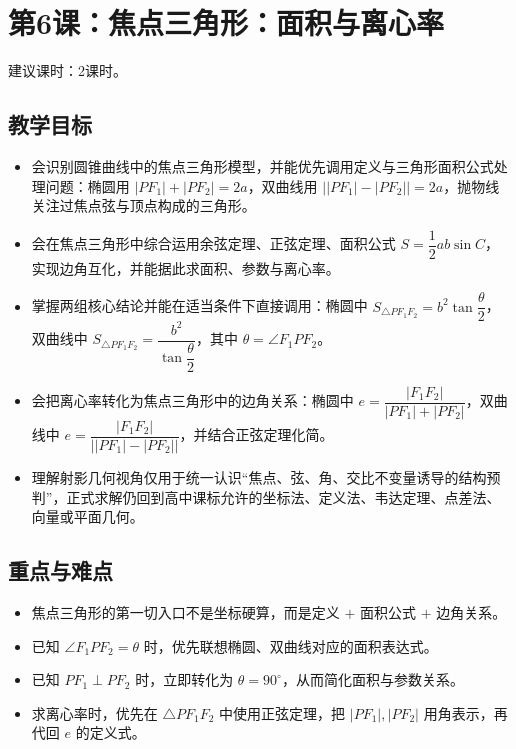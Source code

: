 \documentclass[UTF8,a4paper,11pt]{ctexart}
\begin{document}
\clearpage

\section{第6课：焦点三角形：面积与离心率}

\noindent 建议课时：2课时。

\subsection*{教学目标}

\begin{itemize}

\item 会识别圆锥曲线中的焦点三角形模型，并能优先调用定义与三角形面积公式处理问题：椭圆用 $|PF_1|+|PF_2|=2a$，双曲线用 $\bigl||PF_1|-|PF_2|\bigr|=2a$，抛物线关注过焦点弦与顶点构成的三角形。

\item 会在焦点三角形中综合运用余弦定理、正弦定理、面积公式 $S=\dfrac12 ab\sin C$，实现边角互化，并能据此求面积、参数与离心率。

\item 掌握两组核心结论并能在适当条件下直接调用：椭圆中 $S_{\triangle PF_1F_2}=b^2\tan\dfrac\theta2$，双曲线中 $S_{\triangle PF_1F_2}=\dfrac{b^2}{\tan\dfrac\theta2}$，其中 $\theta=\angle F_1PF_2$。

\item 会把离心率转化为焦点三角形中的边角关系：椭圆中 $e=\dfrac{|F_1F_2|}{|PF_1|+|PF_2|}$，双曲线中 $e=\dfrac{|F_1F_2|}{\bigl||PF_1|-|PF_2|\bigr|}$，并结合正弦定理化简。

\item 理解射影几何视角仅用于统一认识“焦点、弦、角、交比不变量诱导的结构预判”，正式求解仍回到高中课标允许的坐标法、定义法、韦达定理、点差法、向量或平面几何。

\end{itemize}

\subsection*{重点与难点}

\begin{itemize}

\item 焦点三角形的第一切入口不是坐标硬算，而是定义 $+$ 面积公式 $+$ 边角关系。

\item 已知 $\angle F_1PF_2=\theta$ 时，优先联想椭圆、双曲线对应的面积表达式。

\item 已知 $PF_1\perp PF_2$ 时，立即转化为 $\theta=90^\circ$，从而简化面积与参数关系。

\item 求离心率时，优先在 $\triangle PF_1F_2$ 中使用正弦定理，把 $|PF_1|,|PF_2|$ 用角表示，再代回 $e$ 的定义式。

\end{itemize}
\end{document}
